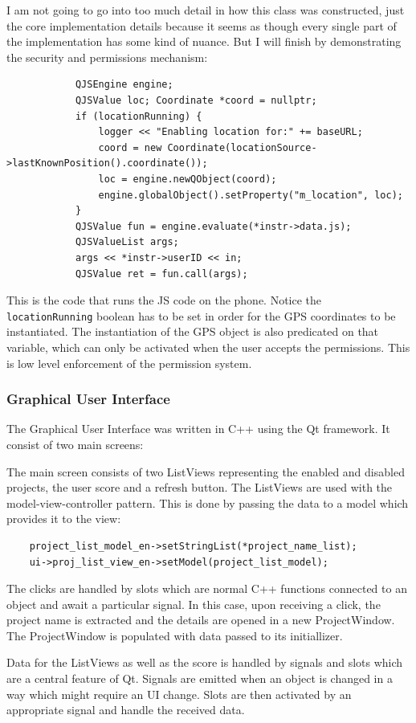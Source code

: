 \documentclass{article}
\begin{document}
I am not going to go into too much detail in how this class was constructed, just the core implementation details because it seems
as though every single part of the implementation has some kind of nuance. But I will finish by demonstrating the security and permissions
mechanism:
\begin{verbatim}
            QJSEngine engine;
            QJSValue loc; Coordinate *coord = nullptr;
            if (locationRunning) {
                logger << "Enabling location for:" += baseURL;
                coord = new Coordinate(locationSource->lastKnownPosition().coordinate());
                loc = engine.newQObject(coord);
                engine.globalObject().setProperty("m_location", loc);
            }
            QJSValue fun = engine.evaluate(*instr->data.js);
            QJSValueList args;
            args << *instr->userID << in;
            QJSValue ret = fun.call(args);
\end{verbatim}
This is the code that runs the JS code on the phone. Notice the \texttt{locationRunning} boolean has to be set in order for the
GPS coordinates to be instantiated. The instantiation of the GPS object is also predicated on that variable, which can only be activated
when the user accepts the permissions. This is low level enforcement of the permission system.

\subsubsection{Graphical User Interface}
The Graphical User Interface was written in C++ using the Qt framework. It consist of two main screens:

The main screen consists of two ListViews representing the enabled and disabled projects, the user score and a refresh button. The ListViews are used with the model-view-controller pattern. This is done by passing the data to a model which provides it to the view:
\begin{verbatim}
    project_list_model_en->setStringList(*project_name_list);
    ui->proj_list_view_en->setModel(project_list_model);    
\end{verbatim}
The clicks are handled by slots which are normal C++ functions connected to an object and await a particular signal. In this case, upon receiving a click, the project name is extracted and the details are opened in a new ProjectWindow. The ProjectWindow is populated with data passed to its initiallizer.

Data for the ListViews as well as the score is handled by signals and slots which are a central feature of Qt. Signals are emitted when an object is changed in a way which might require an UI change. Slots are then activated by an appropriate signal and handle the received data.
\end{document}
